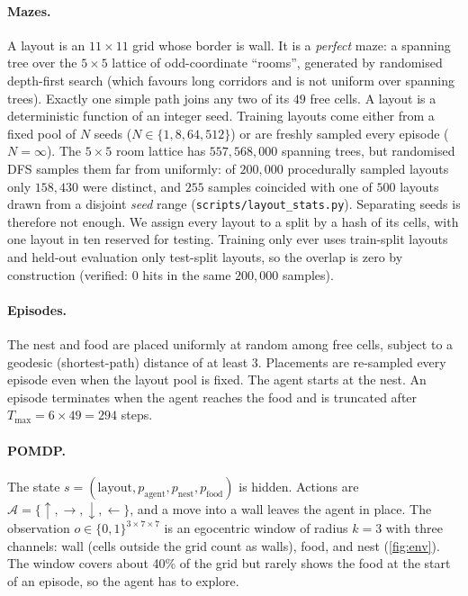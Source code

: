 \documentclass[11pt]{article}
\newcommand{\cA}{\mathcal{A}}
\begin{document}
\paragraph{Mazes.} A layout is an $11\times11$ grid whose border is wall. It
is a \emph{perfect} maze: a spanning tree over the $5\times5$ lattice of
odd-coordinate ``rooms'', generated by randomised depth-first search (which
favours long corridors and is not uniform over spanning trees). Exactly one
simple path joins any two of its $49$ free cells. A layout is a
deterministic function of an integer seed. Training layouts come either
from a fixed pool of $N$ seeds ($N\in\{1,8,64,512\}$) or are freshly sampled
every episode ($N=\infty$). The $5\times5$ room lattice has
$557{,}568{,}000$ spanning trees, but randomised DFS samples them far from
uniformly: of $200{,}000$ procedurally sampled layouts only $158{,}430$ were
distinct, and $255$ samples coincided with one of $500$ layouts drawn from a
disjoint \emph{seed} range (\texttt{scripts/layout\_stats.py}). Separating
seeds is therefore not enough. We assign every layout to a split by a hash of
its cells, with one layout in ten reserved for testing. Training only ever uses
train-split layouts and held-out evaluation only test-split layouts, so the
overlap is zero by construction (verified: $0$ hits in the same $200{,}000$ samples).

\paragraph{Episodes.} The nest and food are placed uniformly at random
among free cells, subject to a geodesic (shortest-path) distance of at least
3. Placements are re-sampled every episode even when the layout pool is
fixed. The agent starts at the nest. An episode terminates when the agent
reaches the food and is truncated after $T_{\max}=6\times49=294$ steps.

\paragraph{POMDP.} The state $s=(\text{layout},p_{\text{agent}},p_{\text{nest}},p_{\text{food}})$
is hidden. Actions are $\cA=\{\uparrow,\rightarrow,\downarrow,\leftarrow\}$,
and a move into a wall leaves the agent in place. The observation $o\in\{0,1\}^{3\times7\times7}$
is an egocentric window of radius $k=3$ with three channels: wall (cells
outside the grid count as walls), food, and nest (\cref{fig:env}). The window
covers about 40\% of the grid but rarely shows the food at the start of an
episode, so the agent has to explore.
\end{document}

